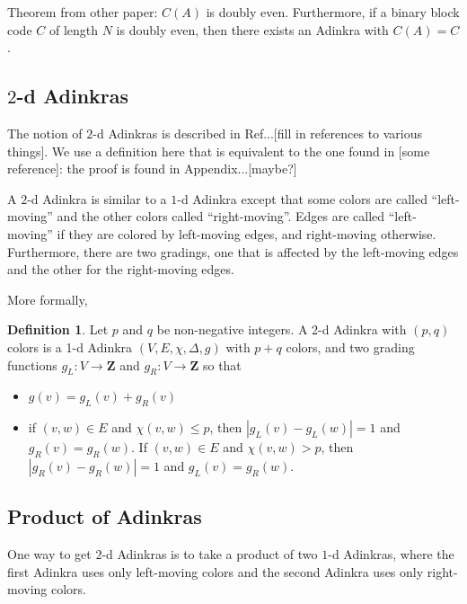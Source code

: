 \documentclass[12pt,twoside,singlespace]{article}
\numberwithin{equation}{section}
\theoremstyle{definition}
\newtheorem{definition}[equation]{Definition}
\newcommand{\ZZ}{\mathbf{Z}}
\begin{document}
Theorem from other paper:
$C(A)$ is doubly even.  Furthermore, if a binary block code $C$ of length $N$ is doubly even, then there exists an Adinkra with $C(A)=C$.


\subsection{$2$-d Adinkras}
The notion of $2$-d Adinkras is described in Ref...[fill in references to various things].  We use a definition here that is equivalent to the one found in [some reference]: the proof is found in Appendix...[maybe?]

A $2$-d Adinkra is similar to a $1$-d Adinkra except that some colors are called ``left-moving'' and the other colors called ``right-moving''.  Edges are called ``left-moving'' if they are colored by left-moving edges, and right-moving otherwise.  Furthermore, there are two gradings, one that is affected by the left-moving edges and the other for the right-moving edges.

More formally,
\begin{definition}
Let $p$ and $q$ be non-negative integers.   A 2-d Adinkra with $(p,q)$ colors is a 1-d Adinkra $(V,E,\chi,\Delta,g)$ with $p+q$ colors, and two grading functions $g_L:V\to \ZZ$ and $g_R:V\to \ZZ$ so that
\begin{itemize}
\item $g(v)=g_L(v)+g_R(v)$
\item if $(v,w)\in E$ and $\chi(v,w)\le p$, then $|g_L(v)-g_L(w)|=1$ and $g_R(v)=g_R(w)$.  If $(v,w)\in E$ and $\chi(v,w)>p$, then $|g_R(v)-g_R(w)|=1$ and $g_L(v)=g_R(w)$.
\end{itemize}
\end{definition}


\subsection{Product of Adinkras}
One way to get $2$-d Adinkras is to take a product of two $1$-d Adinkras, where the first Adinkra uses only left-moving colors and the second Adinkra uses only right-moving colors.
\end{document}
